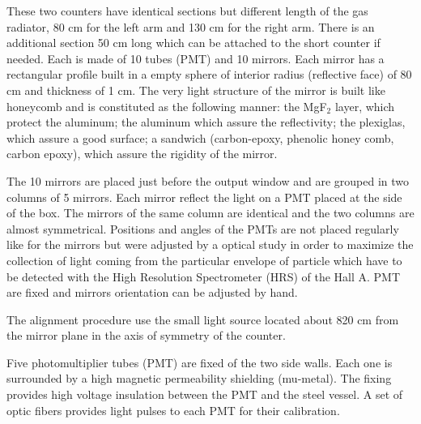 These two counters have identical sections but different length of 
the gas radiator, 80 cm for the left arm and 130 cm for the right arm. 
There is an additional section 50 cm long which can be attached to 
the short counter if needed.
Each \Cherenkov{} is made of 10  tubes (PMT) and 10 mirrors. 
Each mirror has a rectangular profile built in a empty sphere of interior radius 
(reflective face) of 80 cm and thickness of 1 cm. 
The very light structure of the mirror is built like honeycomb 
and is constituted as the following manner: the MgF$_2$ layer, which protect 
the aluminum; the aluminum which assure the reflectivity; 
the plexiglas, which assure a good surface; 
a sandwich (carbon-epoxy, phenolic honey comb, carbon epoxy), 
which assure the rigidity of the mirror. 

The 10 mirrors are placed just before the output window and are grouped in 
two columns of 5 mirrors. 
Each mirror reflect the light on a PMT placed at the side of the box. 
The mirrors of the same column are identical and the two columns are 
almost symmetrical. 
Positions and angles of the PMTs are not placed regularly like for the mirrors 
but were adjusted by a optical study in order to maximize the collection of light 
coming from the particular envelope of particle which have to be detected with 
the High Resolution Spectrometer (HRS) of the Hall A. 
PMT are fixed and mirrors orientation can be adjusted by hand. 

The alignment procedure use the small light source located about 820 cm
from the mirror plane in the axis of symmetry of the counter.

Five photomultiplier tubes (PMT) are fixed of the two side walls. 
Each one is surrounded by a high magnetic permeability shielding (mu-metal). 
The fixing provides high voltage insulation between the PMT and the steel vessel. 
A set of optic fibers provides light pulses to each PMT for their calibration. 

